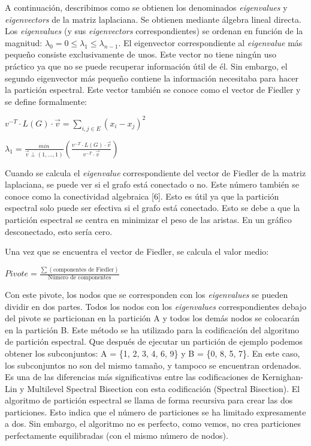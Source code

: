 A continuación, describimos como se obtienen los denominados \textit{eigenvalues} y \textit{eigenvectors} de la matriz laplaciana. Se obtienen mediante álgebra lineal directa. Los \textit{eigenvalues} (y sus \textit{eigenvectors} correspondientes) se ordenan en función de la magnitud: $\lambda_{0} = 0 \leq \lambda_{1} \leq \lambda_{n-1}$. El eigenvector correspondiente al \textit{eigenvalue} más pequeño consiste exclusivamente de unos. Este vector no tiene ningún uso práctico ya que no se puede recuperar información útil de él. Sin embargo, el segundo eigenvector más pequeño contiene la información necesitaba para hacer la partición espectral. Este vector también se conoce como el vector de Fiedler\cite{Fiedler} y se define formalmente:

\begin{center}
	$v^{-T} \cdot L(G) \cdot \vec{v} = \sum_{i,j \in E}^{} (x_{i} - x_{j})^2$
\end{center}

\begin{center}
	$\lambda_{1} = \frac{min}{\vec{v} \perp (1, ..., 1)} \left(\frac{v^{-T} \cdot L(G) \cdot \vec{v}}{v^{-T} \cdot \vec{v}} \right)$
\end{center}

Cuando se calcula el \textit{eigenvalue} correspondiente del vector de Fiedler de la matriz laplaciana, se puede ver si el grafo está conectado o no. Este número también se conoce como la conectividad algebraica [6]. Esto es útil ya que la partición espectral solo puede ser efectiva si el grafo está conectado. Esto se debe a que la partición espectral se centra en minimizar el peso de las aristas. En un gráfico desconectado, esto sería cero. 

\newpage
Una vez que se encuentra el vector de Fiedler, se calcula el valor medio:

\begin{center}
	$Pivote = \frac{\sum (\text{componentes de Fiedler})}{\text{Número de componentes}}$
\end{center}

Con este pivote, los nodos que se corresponden con los \textit{eigenvalues} se pueden dividir en dos partes. Todos los nodos con los \textit{eigenvalues} correspondientes debajo del pivote se particionan en la partición A y todos los demás nodos se colocarán en la partición B. Este método se ha utilizado para la codificación del algoritmo de partición espectral. Que después de ejecutar un partición de ejemplo podemos obtener los subconjuntos: A = \{1, 2, 3, 4, 6, 9\} y B = \{0, 8, 5, 7\}. En este caso, los subconjuntos no son del mismo tamaño, y tampoco se encuentran ordenados. Es una de las diferencias más significativas entre las codificaciones de Kernighan-Lin y Multilevel Spectral Bisection con esta codificación (Spectral Bisection). El algoritmo de partición espectral se llama de forma recursiva para crear las dos particiones. Esto indica que el número de particiones se ha limitado expresamente a dos. Sin embargo, el algoritmo no es perfecto, como vemos, no crea particiones perfectamente equilibradas (con el mismo número de nodos).

